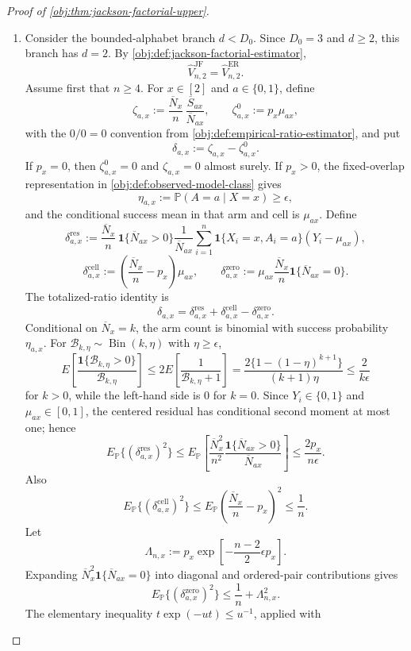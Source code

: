 \begin{proof}[Proof of \cref{obj:thm:jackson-factorial-upper}]
\begin{enumerate}
\item Consider the bounded-alphabet branch \(d<D_0\).  Since \(D_0=3\) and
\(d\ge2\), this branch has \(d=2\).  By
\cref{obj:def:jackson-factorial-estimator},
\[
\widehat V_{n,2}^{\mathrm{JF}}
=
\widehat V_{n,2}^{\mathrm{ER}} .
\]
Assume first that \(n\ge4\).  For \(x\in[2]\) and \(a\in\{0,1\}\), define
\[
\zeta_{a,x}
:=
\frac{\overline N_x}{n}\,
\frac{\overline S_{ax}}{\overline N_{ax}},
\qquad
\zeta^0_{a,x}:=p_x\mu_{ax},
\]
with the \(0/0=0\) convention from
\cref{obj:def:empirical-ratio-estimator}, and put
\[
\delta_{a,x}:=\zeta_{a,x}-\zeta^0_{a,x}.
\]
If \(p_x=0\), then \(\zeta^0_{a,x}=0\) and \(\zeta_{a,x}=0\) almost surely.
If \(p_x>0\), the fixed-overlap representation in
\cref{obj:def:observed-model-class} gives
\[
\eta_{a,x}:=\mathbb P(A=a\mid X=x)\ge\epsilon ,
\]
and the conditional success mean in that arm and cell is \(\mu_{ax}\).  Define
\[
\delta^{\mathrm{res}}_{a,x}
:=
\frac{\overline N_x}{n}\,
\mathbf 1\{\overline N_{ax}>0\}
\frac{1}{\overline N_{ax}}
\sum_{i=1}^n
\mathbf 1\{X_i=x,A_i=a\}(Y_i-\mu_{ax}),
\]
\[
\delta^{\mathrm{cell}}_{a,x}
:=
\left(\frac{\overline N_x}{n}-p_x\right)\mu_{ax},
\qquad
\delta^{\mathrm{zero}}_{a,x}
:=
\mu_{ax}\frac{\overline N_x}{n}\mathbf 1\{\overline N_{ax}=0\}.
\]
The totalized-ratio identity is
\[
\delta_{a,x}
=
\delta^{\mathrm{res}}_{a,x}
+
\delta^{\mathrm{cell}}_{a,x}
-
\delta^{\mathrm{zero}}_{a,x}.
\]
Conditional on \(\overline N_x=k\), the arm count is binomial with success
probability \(\eta_{a,x}\).  For
\(\mathcal B_{k,\eta}\sim\operatorname{Bin}(k,\eta)\) with
\(\eta\ge\epsilon\),
\[
E\!\left[\frac{\mathbf 1\{\mathcal B_{k,\eta}>0\}}{\mathcal B_{k,\eta}}\right]
\le
2E\!\left[\frac{1}{\mathcal B_{k,\eta}+1}\right]
=
\frac{2\{1-(1-\eta)^{k+1}\}}{(k+1)\eta}
\le
\frac{2}{k\epsilon}
\]
for \(k>0\), while the left-hand side is \(0\) for \(k=0\).  Since
\(Y_i\in\{0,1\}\) and \(\mu_{ax}\in[0,1]\), the centered residual has
conditional second moment at most one; hence
\[
E_{\mathbb P}\{(\delta^{\mathrm{res}}_{a,x})^2\}
\le
E_{\mathbb P}\!\left[
\frac{\overline N_x^2}{n^2}
\frac{\mathbf 1\{\overline N_{ax}>0\}}{\overline N_{ax}}
\right]
\le
\frac{2p_x}{n\epsilon}.
\]
Also
\[
E_{\mathbb P}\{(\delta^{\mathrm{cell}}_{a,x})^2\}
\le
E_{\mathbb P}\left(\frac{\overline N_x}{n}-p_x\right)^2
\le
\frac1n .
\]
Let
\[
\Lambda_{n,x}:=
p_x\exp\!\left[-\frac{n-2}{2}\epsilon p_x\right].
\]
Expanding
\(\overline N_x^2\mathbf 1\{\overline N_{ax}=0\}\) into diagonal and
ordered-pair contributions gives
\[
E_{\mathbb P}\{(\delta^{\mathrm{zero}}_{a,x})^2\}
\le
\frac1n+\Lambda_{n,x}^2 .
\]
The elementary inequality \(t\exp(-ut)\le u^{-1}\), applied with

\end{enumerate}
\end{proof}
